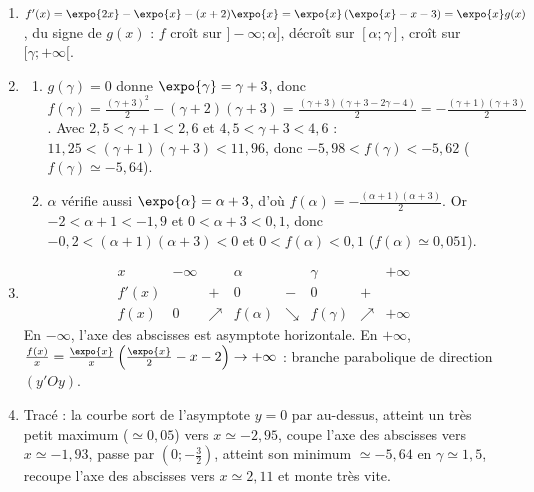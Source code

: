 \begin{corrige}
\begin{sol}
\begin{enumerate}
      En $+\infty$ : $f(x) = \expo{2x}\left(\frac{1}{2} - (x+2)\expo{-x}\right)$ avec $(x+2)\expo{-x} \to 0$ (A.2), donc $f \to +\infty$.
\item $f'(x) = \expo{2x} - \expo{x} - (x+2)\expo{x} = \expo{x}\left(\expo{x} - x - 3\right) = \expo{x} g(x)$, du signe de $g(x)$ :
      $f$ cro\^it sur $]-\infty;\alpha]$, d\'ecro\^it sur $[\alpha;\gamma]$, cro\^it sur $[\gamma;+\infty[$.
\item \begin{enumerate}
      \item $g(\gamma) = 0$ donne $\expo{\gamma} = \gamma + 3$, donc
            $f(\gamma) = \frac{(\gamma+3)^2}{2} - (\gamma+2)(\gamma+3) = \frac{(\gamma+3)\left(\gamma + 3 - 2\gamma - 4\right)}{2} = -\frac{(\gamma+1)(\gamma+3)}{2}$.
            Avec $2{,}5 < \gamma + 1 < 2{,}6$ et $4{,}5 < \gamma + 3 < 4{,}6$ : $11{,}25 < (\gamma+1)(\gamma+3) < 11{,}96$, donc
            $\boxed{-5{,}98 < f(\gamma) < -5{,}62}$ ($f(\gamma) \simeq -5{,}64$).
      \item $\alpha$ v\'erifie aussi $\expo{\alpha} = \alpha + 3$, d'o\`u $f(\alpha) = -\frac{(\alpha+1)(\alpha+3)}{2}$.
            Or $-2 < \alpha + 1 < -1{,}9$ et $0 < \alpha + 3 < 0{,}1$, donc $-0{,}2 < (\alpha+1)(\alpha+3) < 0$ et $0 < f(\alpha) < 0{,}1$
            ($f(\alpha) \simeq 0{,}051$).
      \end{enumerate}
\item \[
      \begin{array}{c|ccccccc}
      x & -\infty & & \alpha & & \gamma & & +\infty \\ \hline
      f'(x) & & + & 0 & - & 0 & + & \\ \hline
      f(x) & 0 & \nearrow & f(\alpha) & \searrow & f(\gamma) & \nearrow & +\infty
      \end{array}
      \]
      En $-\infty$, l'axe des abscisses est asymptote horizontale. En $+\infty$, $\frac{f(x)}{x} = \frac{\expo{x}}{x}\left(\frac{\expo{x}}{2} - x - 2\right) \to +\infty$ :
      branche parabolique de direction $(y'Oy)$.
\item Trac\'e : la courbe sort de l'asymptote $y = 0$ par au-dessus, atteint un tr\`es petit maximum ($\simeq 0{,}05$) vers $x \simeq -2{,}95$,
      coupe l'axe des abscisses vers $x \simeq -1{,}93$, passe par $\left(0;-\frac{3}{2}\right)$, atteint son minimum $\simeq -5{,}64$ en $\gamma \simeq 1{,}5$,
      recoupe l'axe des abscisses vers $x \simeq 2{,}11$ et monte tr\`es vite.
\end{enumerate}
\end{sol}


\end{corrige}
